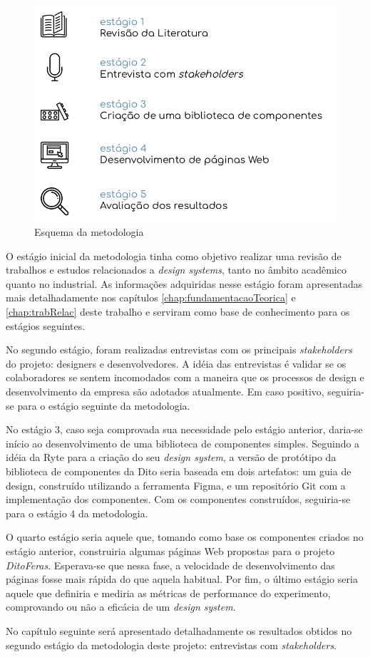 \begin{figure}
	\includegraphics[width=\linewidth]{./04-figuras/04_metodologia/metodologia.png}
  \caption{Esquema da metodologia}
  \label{fig:metodology}
\end{figure}

O estágio inicial da metodologia tinha como objetivo realizar uma revisão de trabalhos e estudos relacionados a \textit{design systems}, tanto no âmbito acadêmico quanto no industrial. As informações adquiridas nesse estágio foram apresentadas mais detalhadamente nos capítulos \ref{chap:fundamentacaoTeorica} e \ref{chap:trabRelac} deste trabalho e serviram como base de conhecimento para os estágios seguintes.

No segundo estágio, foram realizadas entrevistas com os principais \textit{stakeholders} do projeto: designers e desenvolvedores. A idéia das entrevistas é validar se os colaboradores se sentem incomodados com a maneira que os processos de design e desenvolvimento da empresa são adotados atualmente. Em caso positivo, seguiria-se para o estágio seguinte da metodologia.

No estágio 3, caso seja comprovada sua necessidade pelo estágio anterior, daria-se início ao desenvolvimento de uma biblioteca de componentes simples. Seguindo a idéia da Ryte \cite{ryteDesignSystem} para a criação do seu \textit{design system}, a versão de protótipo da biblioteca de componentes da Dito seria baseada em dois artefatos: um guia de design, construído utilizando a ferramenta Figma, e um repositório Git com a implementação dos componentes. Com os componentes construídos, seguiria-se para o estágio 4 da metodologia.

O quarto estágio seria aquele que, tomando como base os componentes criados no estágio anterior, construiria algumas páginas Web propostas para o projeto \textit{DitoFeras}. Esperava-se que nessa fase, a velocidade de desenvolvimento das páginas fosse mais rápida do que aquela habitual. Por fim, o último estágio seria aquele que definiria e mediria as métricas de performance do experimento, comprovando ou não a eficácia de um \textit{design system}.

No capítulo seguinte será apresentado detalhadamente os resultados obtidos no segundo estágio da metodologia deste projeto: entrevistas com \textit{stakeholders}.
